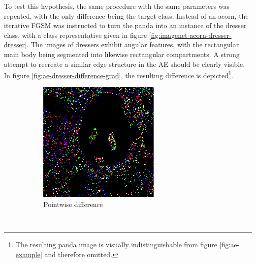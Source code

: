 \documentclass[11pt, a4paper]{article}
\begin{document}
To test this hypothesis, the same procedure with the same parameters was repeated, with the only difference being the target class. Instead of an acorn, the iterative FGSM was instructed to turn the panda into an instance of the dresser class, with a class representative given in figure \ref{fig:imagenet-acorn-dresser-dresser}. The images of dressers exhibit angular features, with the rectangular main body being segmented into likewise rectangular compartments. A strong attempt to recreate a similar edge structure in the AE should be clearly visible. In figure \ref{fig:ae-dresser-difference-grad}, the resulting difference is depicted\footnote{The resulting panda image is visually indistinguishable from figure \ref{fig:ae-example} and therefore omitted.}.

\begin{figure}[h!tb]
    \centering
    \begin{subfigure}[t]{0.45\textwidth}
        \includegraphics[width=\textwidth]{aes/panda_dresser_10_0dot9_posdiff.png}
        \caption{Pointwise difference}
        \label{fig:ae-dresser-difference-diff}
    \end{subfigure}
    ~ %
    \begin{subfigure}[t]{0.45\textwidth}

\end{subfigure}
\end{figure}
\end{document}
